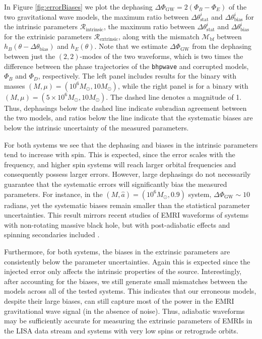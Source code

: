 \documentclass[%
 reprint,
 nofootinbib,
 amsmath,amssymb,
 aps,
 prd,
]{revtex4-2}
\begin{document}
In Figure \ref{fig:errorBiases} we plot the dephasing $\Delta \Phi_\mathrm{GW} = 2(\Phi_B - \Phi_E)$ of the two gravitational wave models, the maximum ratio between $\Delta \theta^i_\mathrm{stat}$ and $\Delta \theta^i_\mathrm{bias}$ for the intrinsic parameters $\mathcal{R}_\mathrm{intrinsic}$, the maximum ratio between $\Delta \theta^i_\mathrm{stat}$ and $\Delta \theta^i_\mathrm{bias}$ for the extrinisic parameters $\mathcal{R}_\mathrm{extrinsic}$, along with the mismatch $\mathcal{M}_\mathrm{bf}$ between $h_B(\theta-\Delta \theta_\mathrm{bias})$ and $h_E(\theta)$. Note that we estimate $\Delta \Phi_\mathrm{GW}$ from the dephasing between just the $(2,2)$-modes of the two waveforms, which is two times the difference between the phase trajectories of the \texttt{bhpwave} and corrupted models, $\Phi_B$ and $ \Phi_D$, respectively. The left panel includes results for the binary with masses $(M, \mu) = (10^6 M_\odot, 10 M_\odot)$, while the right panel is for a binary with $(M, \mu) = (5\times 10^6 M_\odot, 10 M_\odot)$. The dashed line denotes a magnitude of 1. Thus, dephasings below the dashed line indicate subradian agreement between the two models, and ratios below the line indicate that the systematic biases are below the intrinsic uncertainty of the measured parameters.

For both systems we see that the dephasing and biases in the intrinsic parameters tend to increase with spin. This is expected, since the error scales with the frequency, and higher spin systems will reach larger orbital frequencies and consequently possess larger errors. However, large dephasings do not necessarily guarantee that the systematic errors will significantly bias the measured parameters. For instance, in the $(M, \hat{a})=(10^6 M_\odot, 0.9)$ system, $\Delta \Phi_\mathrm{GW} \sim 10$ radians, yet the systematic biases remain smaller than the statistical parameter uncertainties. This result mirrors recent studies of EMRI waveforms of systems with non-rotating massive black hole, but with post-adiabatic effects and spinning secondaries included \cite{BurkETC23}. 

Furthermore, for both systems, the biases in the extrinsic parameters are consistently below the parameter uncertainties. Again this is expected since the injected error only affects the intrinsic properties of the source. Interestingly, after accounting for the biases, we still generate small mismatches between the models across all of the tested systems. This indicates that our erroneous models, despite their large biases, can still capture most of the power in the EMRI gravitational wave signal (in the absence of noise). Thus, adiabatic waveforms may be sufficiently accurate for measuring the extrinsic parameters of EMRIs in the LISA data stream and systems with very low spins or retrograde orbits.  
\end{document}
